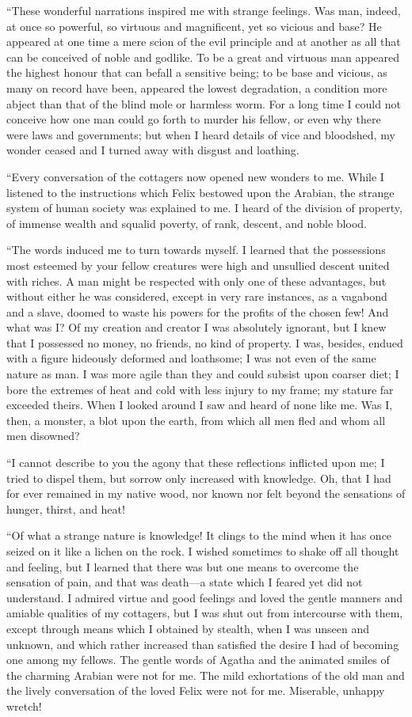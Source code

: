 \documentclass[12pt,openright]{book}
\begin{document}
“These wonderful narrations inspired me with strange feelings. Was man, indeed, at once so powerful, so virtuous and magnificent, yet so vicious and base? He appeared at one time a mere scion of the evil principle and at another as all that can be conceived of noble and godlike. To be a great and virtuous man appeared the highest honour that can befall a sensitive being; to be base and vicious, as many on record have been, appeared the lowest degradation, a condition more abject than that of the blind mole or harmless worm. For a long time I could not conceive how one man could go forth to murder his fellow, or even why there were laws and governments; but when I heard details of vice and bloodshed, my wonder ceased and I turned away with disgust and loathing.

“Every conversation of the cottagers now opened new wonders to me. While I listened to the instructions which Felix bestowed upon the Arabian, the strange system of human society was explained to me. I heard of the division of property, of immense wealth and squalid poverty, of rank, descent, and noble blood.

“The words induced me to turn towards myself. I learned that the possessions most esteemed by your fellow creatures were high and unsullied descent united with riches. A man might be respected with only one of these advantages, but without either he was considered, except in very rare instances, as a vagabond and a slave, doomed to waste his powers for the profits of the chosen few! And what was I? Of my creation and creator I was absolutely ignorant, but I knew that I possessed no money, no friends, no kind of property. I was, besides, endued with a figure hideously deformed and loathsome; I was not even of the same nature as man. I was more agile than they and could subsist upon coarser diet; I bore the extremes of heat and cold with less injury to my frame; my stature far exceeded theirs. When I looked around I saw and heard of none like me. Was I, then, a monster, a blot upon the earth, from which all men fled and whom all men disowned?

“I cannot describe to you the agony that these reflections inflicted upon me; I tried to dispel them, but sorrow only increased with knowledge. Oh, that I had for ever remained in my native wood, nor known nor felt beyond the sensations of hunger, thirst, and heat!

“Of what a strange nature is knowledge! It clings to the mind when it has once seized on it like a lichen on the rock. I wished sometimes to shake off all thought and feeling, but I learned that there was but one means to overcome the sensation of pain, and that was death—a state which I feared yet did not understand. I admired virtue and good feelings and loved the gentle manners and amiable qualities of my cottagers, but I was shut out from intercourse with them, except through means which I obtained by stealth, when I was unseen and unknown, and which rather increased than satisfied the desire I had of becoming one among my fellows. The gentle words of Agatha and the animated smiles of the charming Arabian were not for me. The mild exhortations of the old man and the lively conversation of the loved Felix were not for me. Miserable, unhappy wretch!
\end{document}
